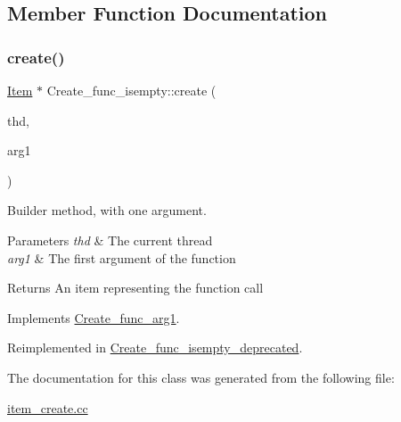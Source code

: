 \subsection{Member Function Documentation}
\mbox{\label{classCreate__func__isempty_aab176e782cca041c5b6e5c24485859e3}} 
\subsubsection{\texorpdfstring{create()}{create()}}
{\footnotesize\ttfamily \mbox{\hyperlink{classItem}{Item}} $\ast$ Create\+\_\+func\+\_\+isempty\+::create (\begin{DoxyParamCaption}\item[{T\+HD $\ast$}]{thd,  }\item[{\mbox{\hyperlink{classItem}{Item}} $\ast$}]{arg1 }\end{DoxyParamCaption})\hspace{0.3cm}{\ttfamily [virtual]}}

Builder method, with one argument. 
\begin{DoxyParams}{Parameters}
{\em thd} & The current thread \\
\hline
{\em arg1} & The first argument of the function \\
\hline
\end{DoxyParams}
\begin{DoxyReturn}{Returns}
An item representing the function call 
\end{DoxyReturn}


Implements \mbox{\hyperlink{classCreate__func__arg1_a3e9a98f755cd82c3e762e334c955a8c9}{Create\+\_\+func\+\_\+arg1}}.



Reimplemented in \mbox{\hyperlink{classCreate__func__isempty__deprecated_ac25a3427cf94499607940b1077c37b29}{Create\+\_\+func\+\_\+isempty\+\_\+deprecated}}.



The documentation for this class was generated from the following file\+:\begin{DoxyCompactItemize}
\item 
\mbox{\hyperlink{item__create_8cc}{item\+\_\+create.\+cc}}\end{DoxyCompactItemize}

